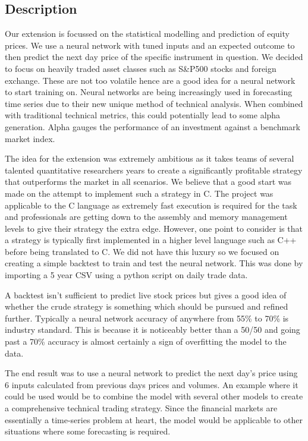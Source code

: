 \documentclass[11pt]{article}
\begin{document}
\subsection{Description}
Our extension is focussed on the statistical modelling and prediction of equity prices. We use a neural network with tuned inputs and an expected outcome to then predict the next day price of the specific instrument in question. We decided to focus on heavily traded asset classes such as S\&P500 stocks and foreign exchange. These are not too volatile hence are a good idea for a neural network to start training on. Neural networks are being increasingly used in forecasting time series due to their new unique method of technical analysis. When combined with traditional technical metrics, this could potentially lead to some alpha generation. Alpha gauges the performance of an investment against a benchmark market index. 

The idea for the extension was extremely ambitious as it takes teams of several talented quantitative researchers years to create a significantly profitable strategy that outperforms the market in all scenarios. We believe that a good start was made on the attempt to implement such a strategy in C. The project was applicable to the C language as extremely fast execution is required for the task and professionals are getting down to the assembly and memory management levels to give their strategy the extra edge. However, one point to consider is that a strategy is typically first implemented in a higher level language such as C++ before being translated to C. We did not have this luxury so we focused on creating a simple backtest to train and test the neural network. This was done by importing a 5 year CSV using a python script on daily trade data. 

A backtest isn't sufficient to predict live stock prices but gives a good idea of whether the crude strategy is something which should be pursued and refined further. Typically a neural network accuracy of anywhere from 55\% to 70\% is industry standard. This is because it is noticeably better than a 50/50 and going past a 70\% accuracy is almost certainly a sign of overfitting the model to the data. 

The end result was to use a neural network to predict the next day's price using 6 inputs calculated from previous days prices and volumes. An example where it could be used would be to combine the model with several other models to create a comprehensive technical trading strategy. Since the financial markets are essentially a time-series problem at heart, the model would be applicable to other situations where some forecasting is required. 
\end{document}
